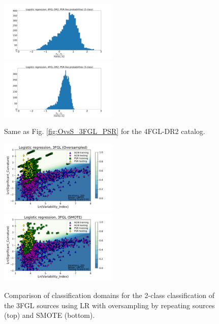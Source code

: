 \documentclass{aa}
\begin{document}
\begin{appendix}
\begin{figure}[h!]
\centering
\hspace*{-0.5cm}
\includegraphics[width=0.5\textwidth]{plots/hist_diff_smote_LR_4FGL-DR2_2class.pdf}
\hspace*{-0.5cm}
\includegraphics[width=0.5\textwidth]{plots/hist_diff_smote_LR_4FGL-DR2_3class.pdf}
\caption{Same as Fig. \ref{fig:OvsS_3FGL_PSR} for the 4FGL-DR2 catalog.
}
\label{fig:OvsS_4FGL_PSR}
\end{figure}

\begin{figure}[h!]
\centering
\includegraphics[width=0.5\textwidth]{plots/classification_domains/domains_oversampled_LR_3FGL_2class.pdf}
\includegraphics[width=0.5\textwidth]{plots/classification_domains/domains_smote_LR_3FGL_2class.pdf}
\caption{Comparison of classification domains for the 2-class classification of the 3FGL sources
using LR with oversampling by repeating sources (top) and SMOTE (bottom).
}
\label{fig:domains_smote_over}
\end{figure}


\end{appendix}
\end{document}
